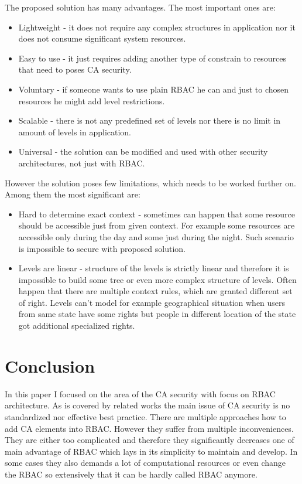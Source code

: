 \documentclass{poster15}
\begin{document}
The proposed solution has many advantages. The most important ones are:

\begin{itemize}
  \item Lightweight - it does not require any complex structures in application nor it does not consume significant system resources.
  
  \item Easy to use - it just requires adding another type of constrain to resources that need to poses CA security.
  
  \item Voluntary - if someone wants to use plain RBAC he can and just to chosen resources he might add level restrictions. 
  
  \item Scalable - there is not any predefined set of levels nor there is no limit in amount of levels in application.
  
  \item Universal - the solution can be modified and used with other security architectures, not just with RBAC.
\end{itemize}

However the solution poses few limitations, which needs to be worked further on. Among them the most significant are:
\begin{itemize}
  \item Hard to determine exact context - sometimes can happen that some resource should be accessible just from given context. For example some resources are accessible only during the day and some just during the night. Such scenario is impossible to secure with proposed solution.
  
  \item Levels are linear - structure of the levels is strictly linear and therefore it is impossible to build some tree or even more complex structure of levels. Often happen that there are multiple context rules, which are granted different set of right. Levels can't model for example geographical situation when users from same state have some rights but people in different location of the state got additional specialized rights.
\end{itemize}

\section{Conclusion}

In this paper I focused on the area of the CA security with focus on RBAC architecture. As is covered by related works the main issue of CA security is no standardized nor effective best practice. There are multiple approaches how to add CA elements into RBAC. However they suffer from multiple inconveniences. They are either too complicated and therefore they significantly decreases one of main advantage of RBAC which lays in its simplicity to maintain and develop. In some cases they also demands a lot of computational resources or even change the RBAC so extensively that it can be hardly called RBAC anymore.
\end{document}

